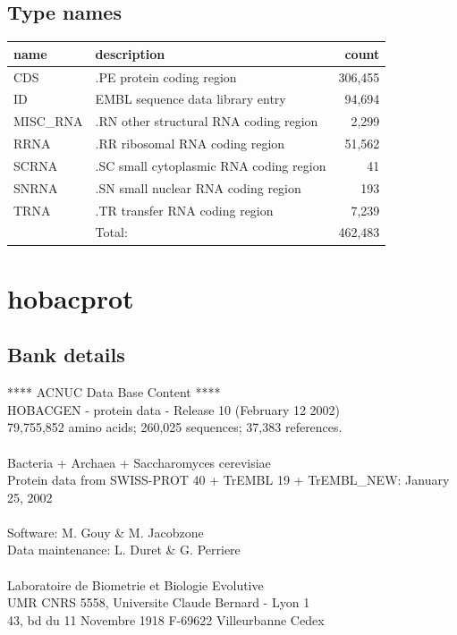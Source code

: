 \documentclass{article}
\begin{document}
\begin{Schunk}
\subsection{Type names}
\noindent\begin{tabular}{llr}
\hline \hline
name & description & count \\
\hline
CDS  &  .PE protein coding region  &  306,455 \\
ID  &  EMBL sequence data library entry  &  94,694 \\
MISC\_RNA  &  .RN other structural RNA coding region  &  2,299 \\
RRNA  &  .RR ribosomal RNA coding region  &  51,562 \\
SCRNA  &  .SC small cytoplasmic RNA coding region  &  41 \\
SNRNA  &  .SN small nuclear RNA coding region  &  193 \\
TRNA  &  .TR transfer RNA coding region  &  7,239 \\
\hline
 & Total: & 462,483 \\
\hline \hline
\end{tabular}

\section{ hobacprot }
\subsection{Bank details}
               ****     ACNUC Data Base Content      ****\\
           HOBACGEN - protein data - Release 10 (February 12 2002)\\
          79,755,852 amino acids; 260,025 sequences; 37,383 references.\\
               \\
              Bacteria + Archaea + Saccharomyces cerevisiae\\
   Protein data from SWISS-PROT 40 + TrEMBL 19 + TrEMBL\_NEW: January 25, 2002\\
\\
Software: M. Gouy \& M. Jacobzone\\
Data maintenance: L. Duret \& G. Perriere\\
\\
Laboratoire de Biometrie et Biologie Evolutive\\
UMR CNRS 5558, Universite Claude Bernard - Lyon 1 \\
43, bd du 11 Novembre 1918 F-69622 Villeurbanne Cedex\\



\end{Schunk}
\end{document}
